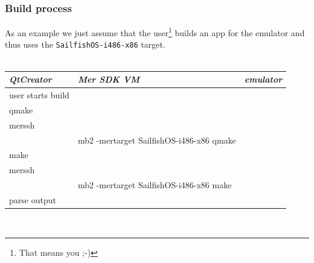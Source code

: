 \subsubsection{Build process}\label{subsubsec:buildprocess}
%
As an example we just assume that the user\footnote{That means you ;-)} builds an app for the emulator and thus uses the \verb,SailfishOS-i486-x86, target.
\\
\\
\begin{tabular}{l|l|l}
  \emph{QtCreator} & \emph{Mer SDK VM} & \emph{emulator} \\ \hline
  \parbox[t]{0.33\textwidth}{user starts build} &
  \parbox[t]{0.33\textwidth}{} &
  \parbox[t]{0.33\textwidth}{} \\ \hline
  \parbox[t]{0.33\textwidth}{qmake} &
  \parbox[t]{0.33\textwidth}{} &
  \parbox[t]{0.33\textwidth}{} \\ \hline
  \parbox[t]{0.33\textwidth}{merssh} &
  \parbox[t]{0.33\textwidth}{} &
  \parbox[t]{0.33\textwidth}{} \\ \hline
  \parbox[t]{0.33\textwidth}{} &
  \parbox[t]{0.33\textwidth}{mb2 -mertarget SailfishOS-i486-x86 qmake} &
  \parbox[t]{0.33\textwidth}{} \\ \hline
  \parbox[t]{0.33\textwidth}{make} &
  \parbox[t]{0.33\textwidth}{} &
  \parbox[t]{0.33\textwidth}{} \\ \hline
  \parbox[t]{0.33\textwidth}{merssh} &
  \parbox[t]{0.33\textwidth}{} &
  \parbox[t]{0.33\textwidth}{} \\ \hline
  \parbox[t]{0.33\textwidth}{} &
  \parbox[t]{0.33\textwidth}{mb2 -mertarget SailfishOS-i486-x86 make} &
  \parbox[t]{0.33\textwidth}{} \\ \hline
  \parbox[t]{0.33\textwidth}{parse output} &
  \parbox[t]{0.33\textwidth}{} &
  \parbox[t]{0.33\textwidth}{} \\ \hline  
\end{tabular} \\
%
%
